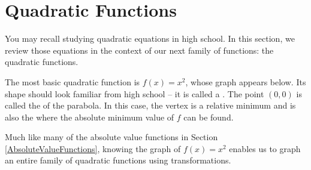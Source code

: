 \section{Quadratic Functions}
\label{QuadraticFunctions}

You may recall studying quadratic equations in high school.  In this section, we review those equations in the context of our next family of functions: the quadratic functions.

\smallskip


\smallskip

The most basic quadratic function is $f(x) = x^2$, whose graph appears below. Its shape should look familiar from high school -- it is called a . The point $(0,0)$ is called the   of the parabola.  In this case, the vertex is a relative minimum and is also the where the absolute minimum value of $f$ can be found. 


Much like many of the absolute value functions in Section \ref{AbsoluteValueFunctions}, knowing the graph of $f(x) = x^2$ enables us to graph an entire family of quadratic functions using transformations.

\medskip



